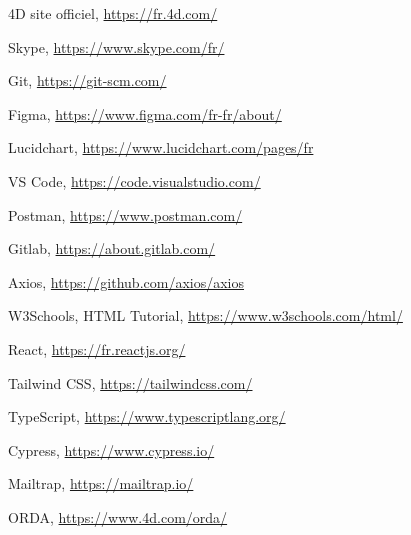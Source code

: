 
\begin{thebibliography}{9}
    
    4D site officiel,     
    \href{https://fr.4d.com/}{https://fr.4d.com/}

    Skype,
    \href{https://www.skype.com/fr/}{https://www.skype.com/fr/}

    Git,
    \href{https://git-scm.com/}{https://git-scm.com/}
   
    Figma, 
    \href{https://www.figma.com/fr-fr/about/}{https://www.figma.com/fr-fr/about/}
    
    Lucidchart,
    \href{https://www.lucidchart.com/pages/fr}{https://www.lucidchart.com/pages/fr}
    
    VS Code,
    \href{https://code.visualstudio.com/}{https://code.visualstudio.com/}
    
    Postman,
    \href{https://www.postman.com/}{https://www.postman.com/}

    Gitlab,
    \href{https://about.gitlab.com/}{https://about.gitlab.com/}

    Axios,
    \href{https://github.com/axios/axios}{https://github.com/axios/axios}
    
    W3Schools, HTML Tutorial,
    \href{https://www.w3schools.com/html/}{https://www.w3schools.com/html/}
    
    React,
    \href{https://fr.reactjs.org/}{https://fr.reactjs.org/}
    
    Tailwind CSS,
    \href{https://tailwindcss.com/}{https://tailwindcss.com/}
    
    TypeScript,
    \href{https://www.typescriptlang.org/}{https://www.typescriptlang.org/}
    
    Cypress,
    \href{https://www.cypress.io/}{https://www.cypress.io/}

    Mailtrap,
    \href{https://mailtrap.io/}{https://mailtrap.io/}
    
    ORDA,
    \href{https://www.4d.com/orda/}{https://www.4d.com/orda/}


    
\end{thebibliography}
